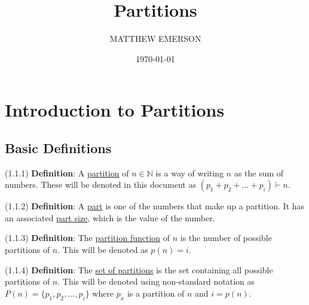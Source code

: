 \documentclass{article}
\title{Partitions}
\author{MATTHEW EMERSON}
\date{\monthyeardate\today} %
\newcommand{\separate}[1] {\vspace{#1 pt}\noindent}
\newcommand{\N}{\mathbb{N}}
\newcommand{\definition}[2]{(#1) \textbf{Definition}: #2}
\begin{document}



\pagestyle{fancy}
\fancyfoot{}




\maketitle
\thispagestyle{empty}




\newpage
\thispagestyle{empty}

\tableofcontents




\setcounter{page}{0}
\newpage

\section{Introduction to Partitions}

\subsection{Basic Definitions}

\definition{1.1.1}{A \underline{partition} of \(n \in \N\) is a way of writing \(n\) as the sum of numbers.} These will be denoted in this document as \((p_1+p_2+...+p_i) \vdash n\).

\separate{5}\definition{1.1.2}{A \underline{part} is one of the numbers that make up a partition. It has an associated \underline{part size}, which is the value of the number.}

\separate{5}\definition{1.1.3}{The \underline{partition function} of \(n\) is the number of possible partitions of \(n\).} This will be denoted as \(p(n) = i\).

\separate{5}\definition{1.1.4}{The \underline{set of partitions} is the set containing all possible partitions of \(n\).} This will be denoted using non-standard notation as \(P(n) = \{p_1, p_2, ..., p_i\}\) where \(p_x\) is a partition of \(n\) and \(i = p(n)\).
\end{document}
